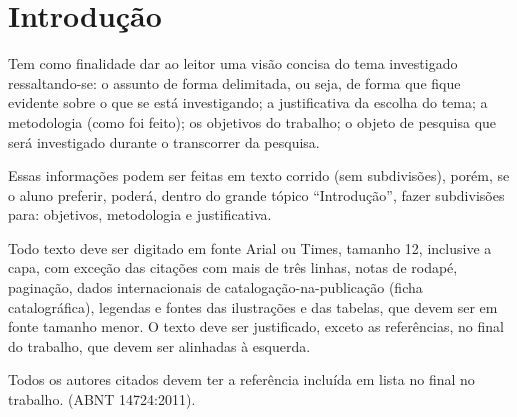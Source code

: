 \chapter{Introdução}

Tem como finalidade dar ao leitor uma visão concisa do tema investigado ressaltando-se: o assunto de forma delimitada, ou seja, de forma que fique evidente sobre o que se está investigando; a justificativa da escolha do tema; a metodologia (como foi feito); os objetivos do trabalho; o objeto de pesquisa que será investigado durante o transcorrer da pesquisa.

Essas informações podem ser feitas em texto corrido (sem subdivisões), porém, se o aluno preferir, poderá, dentro do grande tópico ``Introdução'', fazer subdivisões para: objetivos, metodologia e justificativa.

Todo texto deve ser digitado em fonte Arial ou Times, tamanho 12, inclusive a capa, com exceção das citações com mais de três linhas, notas de rodapé, paginação, dados internacionais de catalogação-na-publicação (ficha catalográfica), legendas e fontes das ilustrações e das tabelas, que devem ser em fonte tamanho menor. O texto deve ser justificado, exceto as referências, no final do trabalho, que devem ser alinhadas à esquerda.

Todos os autores citados devem ter a referência incluída em lista no final no trabalho. (ABNT 14724:2011).